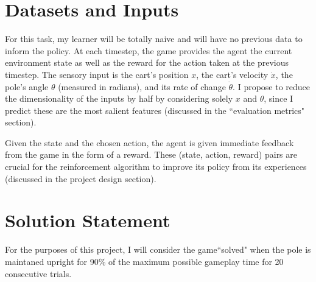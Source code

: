 \documentclass[12pt,a4paper]{article}
\begin{document}
\section*{Datasets and Inputs}
%
%
For this task, my learner will be totally naive and will have no previous data to inform the policy. At each timestep, the game provides the agent the current environment state as well as the reward for the action taken at the previous timestep.  The sensory input is the cart's position $x$, the cart's velocity $\dot x$, the pole's angle $\theta$ (measured in radians), and its rate of change $\dot\theta$.\cite{state_def} I propose to reduce the dimensionality of the inputs by half by considering solely $x$ and $\theta$, since I predict these are the most salient features (discussed in the ``evaluation metrics" section).

Given the state and the chosen action, the agent is given immediate feedback from the game in the form of a reward. These (state, action, reward) pairs are crucial for the reinforcement algorithm to improve its policy from its experiences (discussed in the project design section).

\section*{Solution Statement}
%

For the purposes of this project, I will consider the game``solved" when the pole is maintaned upright for 90\% of the maximum possible gameplay time for 20 consecutive trials.
\end{document}
